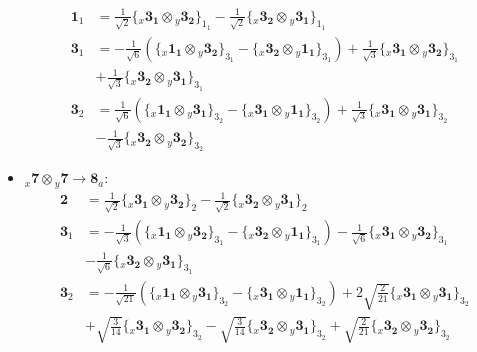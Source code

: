 \documentclass[english]{article}
\newcommand{\rep}[1]{\mathbf{#1}}
\newcommand{\repx}[2]{{}_{#2}\mathbf{#1}}
\newcommand{\subcg}[3]{\big\{ \repx{#1}{x}\otimes\repx{#2}{y}\big\}^{}_{#3}}
\begin{document}
\begin{itemize}
\begin{align*}
\rep{1}_{1} & = \frac{1}{\sqrt{2}}\subcg{3_{1}}{3_{2}}{1_{1}}-\frac{1}{\sqrt{2}}\subcg{3_{2}}{3_{1}}{1_{1}}
\\
\rep{3}_{1} & = -\frac{1}{\sqrt{6}}\left(\subcg{1_{1}}{3_{2}}{3_{1}}-\subcg{3_{2}}{1_{1}}{3_{1}}\right)+\frac{1}{\sqrt{3}}\subcg{3_{1}}{3_{2}}{3_{1}} \\ 
 & +\frac{1}{\sqrt{3}}\subcg{3_{2}}{3_{1}}{3_{1}}
\\
\rep{3}_{2} & = \frac{1}{\sqrt{6}}\left(\subcg{1_{1}}{3_{1}}{3_{2}}-\subcg{3_{1}}{1_{1}}{3_{2}}\right)+\frac{1}{\sqrt{3}}\subcg{3_{1}}{3_{1}}{3_{2}} \\ 
 & -\frac{1}{\sqrt{3}}\subcg{3_{2}}{3_{2}}{3_{2}}
\end{align*}
\item $\repx{7}{x}\otimes\repx{7}{y}\to\rep{8}_{a}$:
\begin{align*}
\rep{2} & = \frac{1}{\sqrt{2}}\subcg{3_{1}}{3_{2}}{2}-\frac{1}{\sqrt{2}}\subcg{3_{2}}{3_{1}}{2}
\\
\rep{3}_{1} & = -\frac{1}{\sqrt{3}}\left(\subcg{1_{1}}{3_{2}}{3_{1}}-\subcg{3_{2}}{1_{1}}{3_{1}}\right)-\frac{1}{\sqrt{6}}\subcg{3_{1}}{3_{2}}{3_{1}} \\ 
 & -\frac{1}{\sqrt{6}}\subcg{3_{2}}{3_{1}}{3_{1}}
\\
\rep{3}_{2} & = -\frac{1}{\sqrt{21}}\left(\subcg{1_{1}}{3_{1}}{3_{2}}-\subcg{3_{1}}{1_{1}}{3_{2}}\right)+2 \sqrt{\frac{2}{21}}\subcg{3_{1}}{3_{1}}{3_{2}} \\ 
 & +\sqrt{\frac{3}{14}}\subcg{3_{1}}{3_{2}}{3_{2}}-\sqrt{\frac{3}{14}}\subcg{3_{2}}{3_{1}}{3_{2}}+\sqrt{\frac{2}{21}}\subcg{3_{2}}{3_{2}}{3_{2}}
\end{align*}
\end{itemize}
\end{document}
